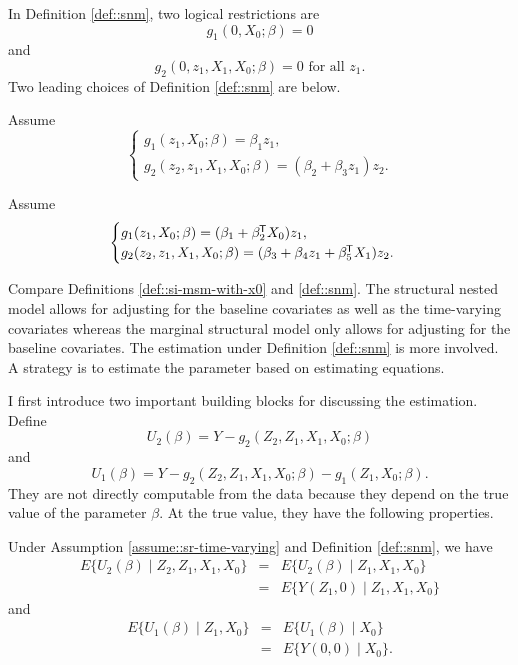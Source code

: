 In Definition \ref{def::snm},  two logical restrictions are 
$$
g_1( 0, X_0; \beta)  = 0
$$
and
$$
g_2(0, z_1,  X_1,  X_0; \beta) =0   \text{ for all } z_1.
$$ 
 Two leading choices of Definition \ref{def::snm} are below.

\begin{example}
\label{example::snm-leading1}
Assume
$$
    \begin{cases}
g_1( z_1, X_0; \beta)  =  \beta_1 z_1, \\
g_2(z_2, z_1,  X_1,  X_0; \beta) =  (\beta_2 + \beta_3 z_1  ) z_2 .
    \end{cases}    
  $$
\end{example}

\begin{example}
\label{example::snm-leading2}
Assume
$$
    \begin{cases}
g_1( z_1, X_0; \beta) = (\beta_1 + \beta_2^{\mkern-1.5mu\mathsf{T}} X_0) z_1, \\
g_2(z_2, z_1,  X_1,  X_0; \beta) = (\beta_3 + \beta_4 z_1  + \beta_5^{\mkern-1.5mu\mathsf{T}} X_1 ) z_2.
    \end{cases}    
    $$
\end{example}
 


Compare Definitions \ref{def::si-msm-with-x0} and \ref{def::snm}. The structural nested model allows for adjusting for the baseline covariates as well as the time-varying covariates whereas the marginal structural model only allows for adjusting for the baseline covariates. The estimation under Definition \ref{def::snm} is more involved. A strategy is to estimate the parameter based on estimating equations. 

I first introduce two important building blocks for discussing the estimation. 
Define 
$$
U_2(\beta) = Y- g_2(Z_2, Z_1, X_1, X_0;\beta) 
$$
and
$$
U_1(\beta) = Y- g_2(Z_2, Z_1, X_1, X_0;\beta)  - g_1( Z_1, X_0;\beta) .
$$
They are not directly computable from the data because they depend on the true value of the parameter $\beta$. At the true value, they have the following properties. 


\begin{lemma}
\label{lemma::snm-1}
Under Assumption \ref{assume::sr-time-varying} and Definition \ref{def::snm}, we have
\begin{eqnarray*}
E\{  U_2(\beta)  \mid Z_2, Z_1, X_1, X_0 \}  &=&  E\{  U_2(\beta)  \mid  Z_1, X_1, X_0 \}  \\
&=&  E\{   Y(Z_1,0) \mid  Z_1, X_1, X_0 \}
\end{eqnarray*}
 and
 \begin{eqnarray*}
E\{  U_1(\beta)  \mid  Z_1, X_0 \}  &=&  E\{  U_1(\beta)  \mid  X_0 \}  \\
&=&  E\{   Y(0,0) \mid   X_0 \}.
\end{eqnarray*}
\end{lemma}


